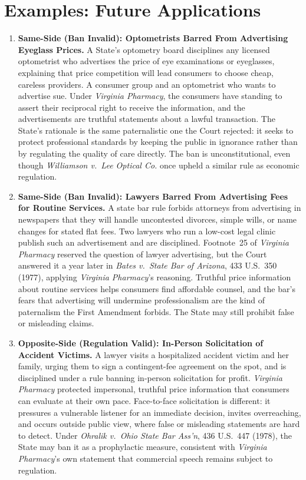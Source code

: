 \documentclass[12pt]{article}
\begin{document}
\section{Examples: Future Applications}
\begin{enumerate}

\item \textbf{Same-Side (Ban Invalid): Optometrists Barred From Advertising Eyeglass Prices.} A State's optometry board disciplines any licensed optometrist who advertises the price of eye examinations or eyeglasses, explaining that price competition will lead consumers to choose cheap, careless providers. A consumer group and an optometrist who wants to advertise sue. Under \textit{Virginia Pharmacy}, the consumers have standing to assert their reciprocal right to receive the information, and the advertisements are truthful statements about a lawful transaction. The State's rationale is the same paternalistic one the Court rejected: it seeks to protect professional standards by keeping the public in ignorance rather than by regulating the quality of care directly. The ban is unconstitutional, even though \textit{Williamson v.\ Lee Optical Co.} once upheld a similar rule as economic regulation.

\item \textbf{Same-Side (Ban Invalid): Lawyers Barred From Advertising Fees for Routine Services.} A state bar rule forbids attorneys from advertising in newspapers that they will handle uncontested divorces, simple wills, or name changes for stated flat fees. Two lawyers who run a low-cost legal clinic publish such an advertisement and are disciplined. Footnote~25 of \textit{Virginia Pharmacy} reserved the question of lawyer advertising, but the Court answered it a year later in \textit{Bates v.\ State Bar of Arizona}, 433 U.S.\ 350 (1977), applying \textit{Virginia Pharmacy}'s reasoning. Truthful price information about routine services helps consumers find affordable counsel, and the bar's fears that advertising will undermine professionalism are the kind of paternalism the First Amendment forbids. The State may still prohibit false or misleading claims.

\item \textbf{Opposite-Side (Regulation Valid): In-Person Solicitation of Accident Victims.} A lawyer visits a hospitalized accident victim and her family, urging them to sign a contingent-fee agreement on the spot, and is disciplined under a rule banning in-person solicitation for profit. \textit{Virginia Pharmacy} protected impersonal, truthful price information that consumers can evaluate at their own pace. Face-to-face solicitation is different: it pressures a vulnerable listener for an immediate decision, invites overreaching, and occurs outside public view, where false or misleading statements are hard to detect. Under \textit{Ohralik v.\ Ohio State Bar Ass'n}, 436 U.S.\ 447 (1978), the State may ban it as a prophylactic measure, consistent with \textit{Virginia Pharmacy}'s own statement that commercial speech remains subject to regulation.


\end{enumerate}
\end{document}
